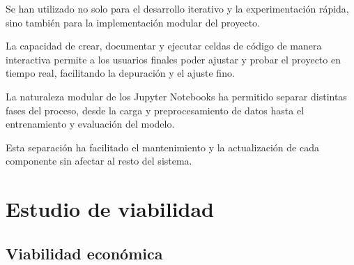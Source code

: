 \begin{enumerate}
Se han utilizado no solo para el desarrollo iterativo y la experimentación rápida, sino también para la implementación modular del proyecto. 

La capacidad de crear, documentar y ejecutar celdas de código de manera interactiva permite a los usuarios finales poder ajustar y probar el proyecto en tiempo real, facilitando la depuración y el ajuste fino.

La naturaleza modular de los Jupyter Notebooks ha permitido separar distintas fases del proceso, desde la carga y preprocesamiento de datos hasta el entrenamiento y evaluación del modelo. 

Esta separación ha facilitado el mantenimiento y la actualización de cada componente sin afectar al resto del sistema.

\end{enumerate}





\section{Estudio de viabilidad}


\subsection{Viabilidad económica}

